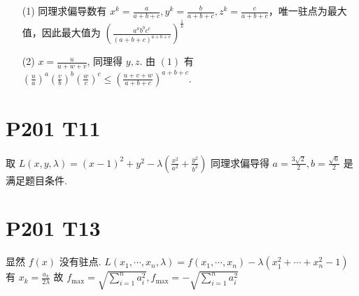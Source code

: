 \documentclass{article}
\begin{document}
\begin{itemize}
    \item [(1)] 同理求偏导数有 $x^k = \frac{a}{a + b + c}, y^k = \frac{b}{a + b + c}, z^k = \frac{c}{a + b + c}$，唯一驻点为最大值，因此最大值为 $\left(\frac{a^ab^bc^c}{(a + b + c)^{a + b + c}}\right)^{\frac{1}{k}}$
    \item [(2)] $x = \frac{u}{u + w + v}$, 同理得 $y, z$. 由 $(1)$ 有 $\left(\frac{u}{a}\right)^a\left(\frac{v}{b}\right)^b\left(\frac{w}{c}\right)^c \leq \left(\frac{u + v + w}{a + b + c}\right)^{a + b + c}$.
\end{itemize}

\section*{P201 T11}

取 $L(x, y, \lambda) = (x - 1)^2 + y^2 - \lambda\left(\frac{x^2}{a^2} + \frac{y^2}{b^2}\right)$ 同理求偏导得 $a = \frac{3\sqrt{2}}{2}, b = \frac{\sqrt{6}}{2}$ 是满足题目条件.

\section*{P201 T13}

显然 $f(x)$ 没有驻点. $L(x_1, \cdots, x_n, \lambda) = f(x_1, \cdots, x_n) - \lambda(x_1^2 + \cdots + x_n^2 - 1)$ 有 $x_k = \frac{a_k}{2\lambda}$ 故 $f_\mathrm{max} = \sqrt{\sum_{i = 1}^{n}a_i^2}, f_\mathrm{max} = -\sqrt{\sum_{i = 1}^{n}a_i^2}$
\end{document}
